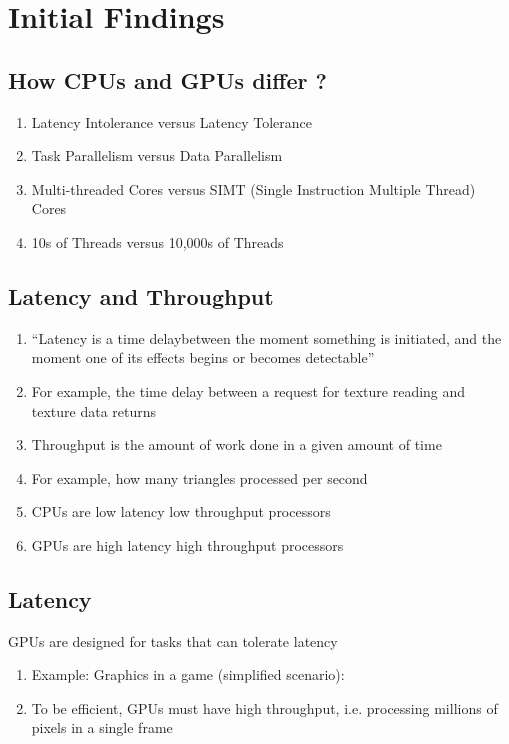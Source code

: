 \chapter{Initial Findings}

\section{How CPUs and GPUs differ ?}
\begin{enumerate}
\item Latency Intolerance versus Latency Tolerance
\item Task Parallelism versus Data Parallelism
\item Multi-threaded Cores versus SIMT (Single Instruction Multiple Thread) Cores
\item 10s of Threads versus 10,000s of Threads
\end{enumerate}

\section{Latency and Throughput}
\begin{enumerate}
\item “Latency is a time delaybetween the moment something is initiated, 
and the moment one of its effects begins or becomes detectable”
\item For example, the time delay between a request for texture reading and texture 
data returns
\item Throughput is the amount of work done in a given amount of time
\item For example, how many triangles processed per second
\item CPUs are low latency low throughput processors
\item GPUs are high latency high throughput processors
\end{enumerate}

\section{Latency}
GPUs are designed for tasks that can tolerate latency
\begin{enumerate}
\item Example: Graphics in a game (simplified scenario): 
\item To be efficient, GPUs must have high throughput, i.e. processing millions of pixels in a single frame
\end{enumerate}

